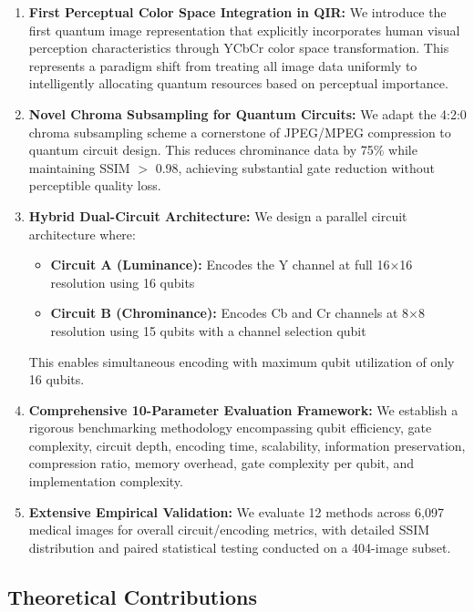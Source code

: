 \documentclass[11pt,a4paper]{article}
\begin{document}
\begin{enumerate}[label=\textbf{C\arabic*:}]
    \item \textbf{First Perceptual Color Space Integration in QIR:} We introduce the first quantum image representation that explicitly incorporates human visual perception characteristics through YCbCr color space transformation. This represents a paradigm shift from treating all image data uniformly to intelligently allocating quantum resources based on perceptual importance.
    
    \item \textbf{Novel Chroma Subsampling for Quantum Circuits:} We adapt the 4:2:0 chroma subsampling scheme a cornerstone of JPEG/MPEG compression to quantum circuit design. This reduces chrominance data by 75\% while maintaining SSIM $>$ 0.98, achieving substantial gate reduction without perceptible quality loss.
    
    \item \textbf{Hybrid Dual-Circuit Architecture:} We design a parallel circuit architecture where:
    \begin{itemize}
        \item \textbf{Circuit A (Luminance):} Encodes the Y channel at full 16×16 resolution using 16 qubits
        \item \textbf{Circuit B (Chrominance):} Encodes Cb and Cr channels at 8×8 resolution using 15 qubits with a channel selection qubit
    \end{itemize}
    This enables simultaneous encoding with maximum qubit utilization of only 16 qubits.
    
    \item \textbf{Comprehensive 10-Parameter Evaluation Framework:} We establish a rigorous benchmarking methodology encompassing qubit efficiency, gate complexity, circuit depth, encoding time, scalability, information preservation, compression ratio, memory overhead, gate complexity per qubit, and implementation complexity.
    
    \item \textbf{Extensive Empirical Validation:} We evaluate 12 methods across 6,097 medical images for overall circuit/encoding metrics, with detailed SSIM distribution and paired statistical testing conducted on a 404-image subset.
\end{enumerate}

\subsection{Theoretical Contributions}
\end{document}

